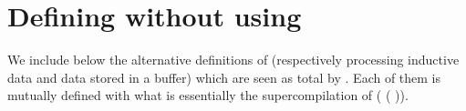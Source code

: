 \section{Defining  without using \assertTotal{}}\label{sec:safefold}

We include below the alternative definitions of 
(respectively processing inductive data and data stored in a buffer)
which are seen as total by \idris{}.
%
Each of them is mutually defined with what is essentially
the supercompilation of
(\IdrisKeyword{\textbackslash}  \IdrisKeyword{=>}   ( )).


